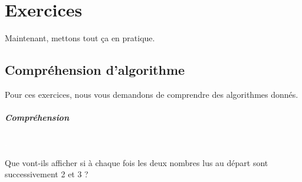 \documentclass[11pt,a4paper]{article}
\begin{document}
            \par
        \section{Exercices}
				Maintenant, mettons tout \c ca en pratique.
      
            \par
        \subsection{Compr\'ehension d'algorithme}
          Pour ces exercices, nous vous demandons de comprendre des algorithmes donn\'es. 
          
			
		\subparagraph{Compr\'ehension} 
		
                \textcolor{white}{.} \par
            
							  Que vont-ils afficher si \`a chaque fois les deux nombres lus au d\'epart sont successivement 2 et 3 ?
							
\end{document}
